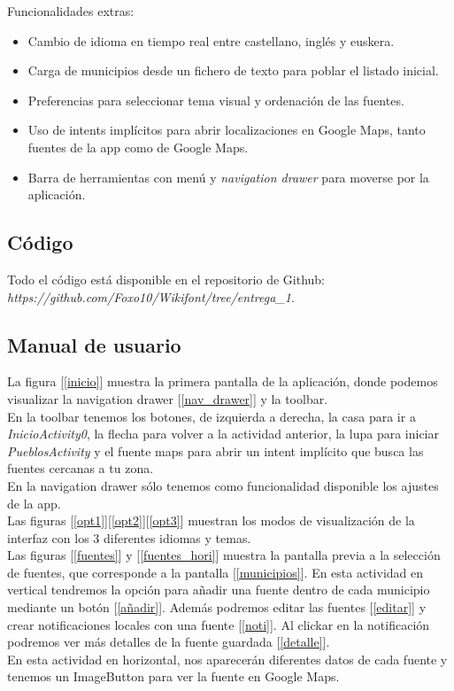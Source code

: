 \documentclass[11pt,a4paper]{article}
\begin{document}
	
    Funcionalidades extras:\\
    
\begin{itemize}
  \item Cambio de idioma en tiempo real entre castellano, inglés y euskera.
  \item Carga de municipios desde un fichero de texto para poblar el listado inicial.
  \item Preferencias para seleccionar tema visual y ordenación de las fuentes.
  \item Uso de intents implícitos para abrir localizaciones en Google Maps, tanto fuentes de la app como de Google Maps.
  \item Barra de herramientas con menú y \textit{navigation drawer} para moverse por la aplicación.
\end{itemize}


\subsection{Código}

Todo el código está disponible en el repositorio de Github: \\ \textit{https://github.com/Foxo10/Wikifont/tree/entrega\_1}. \\

\subsection{Manual de usuario}

	La figura [\ref{inicio}] muestra la primera pantalla de la aplicación, donde podemos visualizar la navigation drawer [\ref{nav_drawer}] y la toolbar. \\
    En la toolbar tenemos los botones, de izquierda a derecha, la casa para ir a \textit{InicioActivity0}, la flecha para volver a la actividad anterior, la lupa para iniciar \textit{PueblosActivity} y el fuente maps para abrir un intent implícito que busca las fuentes cercanas a tu zona. \\
    En la navigation drawer sólo tenemos como funcionalidad disponible los ajustes de la app.\\

    Las figuras [\ref{opt1}][\ref{opt2}][\ref{opt3}] muestran los modos de visualización de la interfaz con los 3 diferentes idiomas y temas. \\
    
    Las figuras [\ref{fuentes}] y [\ref{fuentes_hori}] muestra la pantalla previa a la selección de fuentes, que corresponde a la pantalla [\ref{municipios}]. En esta actividad en vertical tendremos la opción para añadir una fuente dentro de cada municipio mediante un botón [\ref{añadir}]. Además podremos editar las fuentes [\ref{editar}] y crear notificaciones locales con una fuente [\ref{noti}]. Al clickar en la notificación podremos ver más detalles de la fuente guardada [\ref{detalle}]. \\
    En esta actividad en horizontal, nos aparecerán diferentes datos de cada fuente y tenemos un ImageButton para ver la fuente en Google Maps.\\
\end{document}
